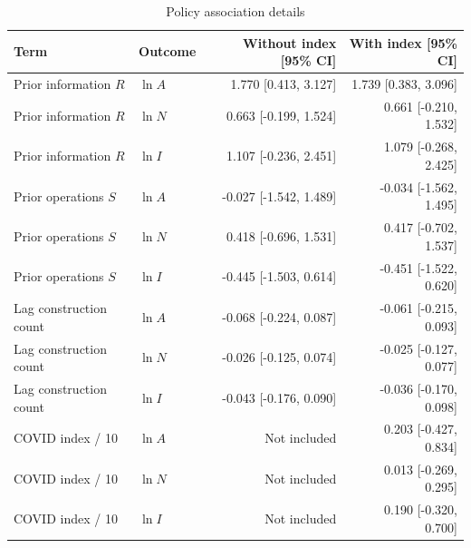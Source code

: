 \begin{table}[htbp]\centering\setlength{\tabcolsep}{4pt}\small
\caption{Policy association details}\label{tab:si_policy_association}
\begin{tabular}{@{}llrr@{}}\toprule
Term & Outcome & Without index [95\% CI] & With index [95\% CI]\\\midrule
Prior information $R$ & $\ln A$ & 1.770 [0.413, 3.127] & 1.739 [0.383, 3.096]\\
Prior information $R$ & $\ln N$ & 0.663 [-0.199, 1.524] & 0.661 [-0.210, 1.532]\\
Prior information $R$ & $\ln I$ & 1.107 [-0.236, 2.451] & 1.079 [-0.268, 2.425]\\
Prior operations $S$ & $\ln A$ & -0.027 [-1.542, 1.489] & -0.034 [-1.562, 1.495]\\
Prior operations $S$ & $\ln N$ & 0.418 [-0.696, 1.531] & 0.417 [-0.702, 1.537]\\
Prior operations $S$ & $\ln I$ & -0.445 [-1.503, 0.614] & -0.451 [-1.522, 0.620]\\
Lag construction count & $\ln A$ & -0.068 [-0.224, 0.087] & -0.061 [-0.215, 0.093]\\
Lag construction count & $\ln N$ & -0.026 [-0.125, 0.074] & -0.025 [-0.127, 0.077]\\
Lag construction count & $\ln I$ & -0.043 [-0.176, 0.090] & -0.036 [-0.170, 0.098]\\
COVID index / 10 & $\ln A$ & Not included & 0.203 [-0.427, 0.834]\\
COVID index / 10 & $\ln N$ & Not included & 0.013 [-0.269, 0.295]\\
COVID index / 10 & $\ln I$ & Not included & 0.190 [-0.320, 0.700]\\
\bottomrule\end{tabular}
\end{table}
